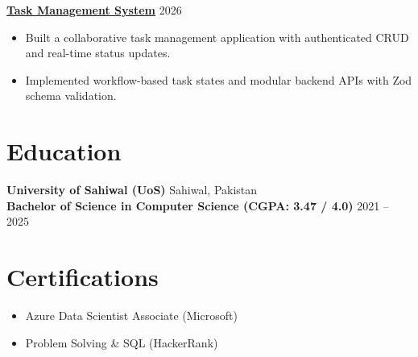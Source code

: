 \documentclass[a4paper,11pt]{article}
\begin{document}
\textbf{\href{https://client-eight-puce-44.vercel.app}{Task Management System}} \hfill 2026 \\
\begin{itemize}
    \item Built a collaborative task management application with authenticated CRUD and real-time status updates.
    \item Implemented workflow-based task states and modular backend APIs with Zod schema validation.
\end{itemize}

\section{Education}
\textbf{University of Sahiwal (UoS)} \hfill Sahiwal, Pakistan \\
\textbf{Bachelor of Science in Computer Science (CGPA: 3.47 / 4.0)} \hfill 2021 -- 2025

\section{Certifications}
\begin{itemize}
    \item Azure Data Scientist Associate (Microsoft)
    \item Problem Solving \& SQL (HackerRank)
\end{itemize}
\end{document}
